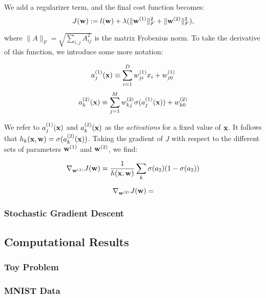 We add a regularizer term, and the final cost function becomes:
\begin{equation}
J(\boldsymbol{\mathbf{w}}) := l(\boldsymbol{\mathbf{w}}) + \lambda(\|\boldsymbol{\mathbf{w}}^{(1)}\|^2_F + \|\boldsymbol{\mathbf{w}}^{(2)}\|^2_F),
\end{equation}

where $\|A\|_F = \sqrt{\sum_{i,j} A^2_{ij}}$ is the matrix Frobenius norm.  To take the derivative of this function, we introduce some more notation:

\begin{equation}
a^{(1)}_j(\boldsymbol{\mathbf{x}}) \equiv \sum_{i=1}^D w_{ji}^{(1)} x_i + w_{j0}^{(1)}
\end{equation}
\begin{equation}
a^{(2)}_k(\boldsymbol{\mathbf{x}}) \equiv \sum_{j=1}^M w_{kj}^{(2)} \sigma(a^{(1)}_j(\boldsymbol{\mathbf{x}})) + w_{k0}^{(2)}
\end{equation}

We refer to $a^{(1)}_j(\boldsymbol{\mathbf{x}})$ and $a^{(2)}_k(\boldsymbol{\mathbf{x}})$ as the \emph{activations} for a fixed value of $\boldsymbol{\mathbf{x}}$.  It follows that $h_{k}(\boldsymbol{\mathbf{x}},\boldsymbol{\mathbf{w}}) = \sigma(a^{(2)}_k(\boldsymbol{\mathbf{x}}))$.  Taking the gradient of $J$ with respect to the different sets of parameters $\boldsymbol{\mathbf{w}}^{(1)}$ and $\boldsymbol{\mathbf{w}}^{(2)}$, we find:  

\begin{equation}
\nabla_{\boldsymbol{\mathbf{w}}^{(1)}} J(\boldsymbol{\mathbf{w}}) = \frac{1}{h(\boldsymbol{\mathbf{x}},\boldsymbol{\mathbf{w}})}\sum_k \sigma(a_2) (1 - \sigma(a_2))
\end{equation}

\begin{equation}
\nabla_{\boldsymbol{\mathbf{w}}^{(2)}} J(\boldsymbol{\mathbf{w}}) = 
\end{equation}

\subsubsection{Stochastic Gradient Descent}



\subsection{Computational Results}

\subsubsection{Toy Problem}

\subsubsection{MNIST Data}



